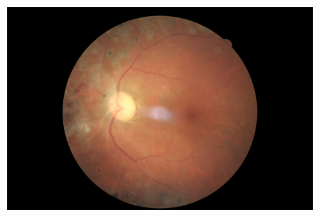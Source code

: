 \begin{figure}[htbp]
\begin{subfigure}[b]{0.19\textwidth}
     \end{subfigure}
     \hfill
     \begin{subfigure}[b]{0.19\textwidth}
         \centering
         \includegraphics[width=\textwidth, height=\textwidth]{figures/chapter4/Dataset/proliferative/294_left.jpeg}
     \end{subfigure}


\end{figure}
